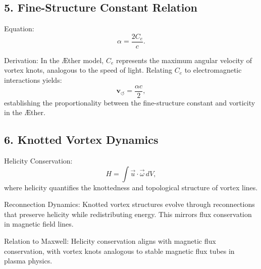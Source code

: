         \subsection*{5. Fine-Structure Constant Relation}
        Equation:
        \begin{equation*}
            \alpha = \frac{2C_e}{c}.
        \end{equation*}

        Derivation:
        In the Æther model, $C_e$ represents the maximum angular velocity of vortex knots, analogous to the speed of light. Relating $C_e$ to electromagnetic interactions yields:
        \begin{equation*}
            \mathbf{v}_{\scriptscriptstyle\boldsymbol{\circlearrowleft}} = \frac{\alpha c}{2},
        \end{equation*}
        establishing the proportionality between the fine-structure constant and vorticity in the Æther.

        \subsection*{6. Knotted Vortex Dynamics}
        Helicity Conservation:
        \begin{equation*}
            H = \int \vec{u} \cdot \vec{\omega} \, dV,
        \end{equation*}
        where helicity quantifies the knottedness and topological structure of vortex lines.

        Reconnection Dynamics:
        Knotted vortex structures evolve through reconnections that preserve helicity while redistributing energy. This mirrors flux conservation in magnetic field lines.

        Relation to Maxwell:
        Helicity conservation aligns with magnetic flux conservation, with vortex knots analogous to stable magnetic flux tubes in plasma physics.

